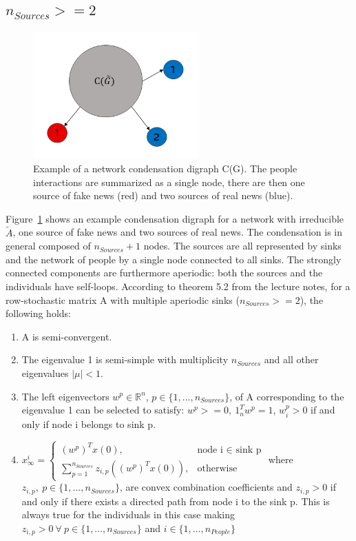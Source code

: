 \subsection{$n_{Sources} >= 2$}
\begin{figure}[!t]
	\centering
	\includegraphics[width=2.5in]{Figures/condensation_digraph.png}
	\caption{Example of a network condensation digraph C(G). The people interactions are summarized as a single node, there are then one source of fake news (red) and two sources of real news (blue).}
	\label{pics:condensation_digraph_example}
\end{figure}
Figure~\ref{pics:condensation_digraph_example} shows an example condensation digraph for a network with irreducible $\tilde{A}$, one source of fake news and two sources of real news. The condensation is in general composed of $n_{Sources}+1$ nodes. The sources are all represented by sinks and the network of people by a single node connected to all sinks. \newline
The strongly connected components are furthermore aperiodic: both the sources and the individuals have self-loops.
According to theorem 5.2 from the lecture notes, for a row-stochastic matrix A with multiple aperiodic sinks ($n_{Sources} >= 2$), the following holds:
\begin{enumerate}
	\item
	A is semi-convergent.
	\item
	The eigenvalue 1 is semi-simple with multiplicity $n_{Sources}$ and all other eigenvalues $|\mu|<1$.
	\item
	The left eigenvectors $w^p \in \mathbb{R}^n$, $p\in \{1,...,n_{Sources}\}$, of A corresponding to the eigenvalue 1 can be selected to satisfy: $w^p>=0,\ 1_n^Tw^p=1$, $w^p_i>0$ if and only if node i belongs to sink p.
	\item
	$
	x_{\infty}^i = 
	\begin{cases}
	(w^p)^Tx(0),& \text{node i $\in$ sink p}\\
	\sum_{p=1}^{n_{Sources}} z_{i,p}((w^p)^Tx(0)), & \text{otherwise}
	\end{cases}
	$
	where $z_{i,p},\ p\in\{1,...,n_{Sources}\}$, are convex combination coefficients and $z_{i,p} > 0$ if and only if there exists a directed path from node i to the sink p. This is always true for the individuals in this case making $z_{i,p} > 0\ \forall\ p \in \{1,...,n_{Sources}\}$ and $i \in \{1,...,n_{People}\}$
\end{enumerate}
